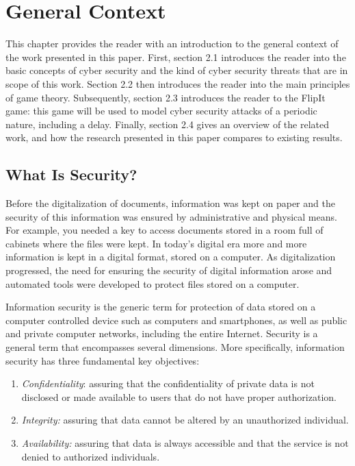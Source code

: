 \chapter{General Context}
\label{Chapter1:Intro.Game.Theory}
%


This chapter provides the reader with an introduction to the general context of the work presented in this paper.  First, section 2.1 introduces the reader into the basic concepts of cyber security and the kind of cyber security threats that are in scope of this work. Section 2.2 then introduces the reader into the main principles of game theory. Subsequently, section 2.3 introduces the reader to the FlipIt game: this game will be used to model cyber security attacks of a periodic nature, including a delay.  Finally, section 2.4 gives an overview of the related work, and how the research presented in this paper compares to existing results.
\section{What Is Security?}

Before the digitalization of documents, information was kept on paper and the security of this information was ensured by administrative and physical means. For example, you needed a key to access documents stored in a room full of cabinets where the files were kept. In today's digital era more and more information is kept in a digital format, stored on a computer.  As digitalization progressed, the need for ensuring the security of digital information arose and automated tools were developed to protect files stored on a computer.  

Information security is the generic term for protection of data stored on a computer controlled device such as computers and smartphones, as well as public and private computer networks, including the entire Internet. 
Security is a general term that encompasses several dimensions. More specifically, information security has three fundamental key objectives:

\begin{enumerate}
\item  \textit{Confidentiality}: assuring that the confidentiality of private data is not disclosed or made available to users that do not have proper authorization.
\item \textit{Integrity:} assuring that data cannot be altered by an unauthorized individual.
\item \textit{Availability:} assuring that data is always accessible and that the service is not denied to authorized individuals.
\end{enumerate}




